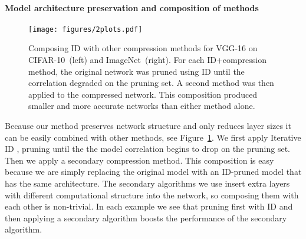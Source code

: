 \paragraph{Model architecture preservation and composition of methods }

\begin{figure}[h]
    \centering
    \texttt{[image: figures/2plots.pdf]} %
    \caption{
    Composing ID with other compression methods for VGG-16 on CIFAR-10~(left) and ImageNet~(right).  
    For each ID+compression method, the original network was pruned using ID until the correlation degraded on the pruning set. A second method was then applied to the compressed network. 
    This composition produced
    smaller and more accurate networks than either method alone.}
    \label{fig:combiningID}
\end{figure}

Because our method preserves network structure and only reduces layer sizes it can be easily combined with other methods, see Figure~\ref{fig:combiningID}.  
We first apply Iterative ID
, pruning until the the model correlation begins to drop on the pruning set.
Then we apply a secondary compression method.
This composition is easy because we are simply replacing the original model with an ID-pruned model that has the same architecture.  The secondary algorithms we use insert extra layers with different computational structure into the network, so composing them with each other is non-trivial. In each example we see that pruning first with ID and then applying a secondary algorithm boosts the performance of the secondary algorithm.  


